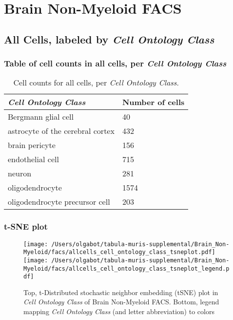 \clearpage
\section{Brain Non-Myeloid FACS}

\subsection{All Cells, labeled by \emph{Cell Ontology Class}}
\subsubsection{Table of cell counts in all cells, per \emph{Cell Ontology Class}}\begin{table}[h]
\centering
\label{my-label}
\begin{tabular}{@{}ll@{}}
\toprule

\emph{Cell Ontology Class}& Number of cells \\ \midrule
Bergmann glial cell & 40 \\

astrocyte of the cerebral cortex & 432 \\

brain pericyte & 156 \\

endothelial cell & 715 \\

neuron & 281 \\

oligodendrocyte & 1574 \\

oligodendrocyte precursor cell & 203 \\
\bottomrule
\end{tabular}
\caption{Cell counts for all cells, per \emph{Cell Ontology Class}.}
\end{table}

\clearpage
\subsubsection{t-SNE plot}
\begin{figure}[h]
\centering
\texttt{[image: /Users/olgabot/tabula-muris-supplemental/Brain\_Non-Myeloid/facs/allcells\_cell\_ontology\_class\_tsneplot.pdf]}
\texttt{[image: /Users/olgabot/tabula-muris-supplemental/Brain\_Non-Myeloid/facs/allcells\_cell\_ontology\_class\_tsneplot\_legend.pdf]}
\caption{Top, t-Distributed stochastic neighbor embedding (tSNE) plot  in \emph{Cell Ontology Class} of Brain Non-Myeloid FACS. Bottom, legend mapping \emph{Cell Ontology Class} (and letter abbreviation) to colors}
\end{figure}


